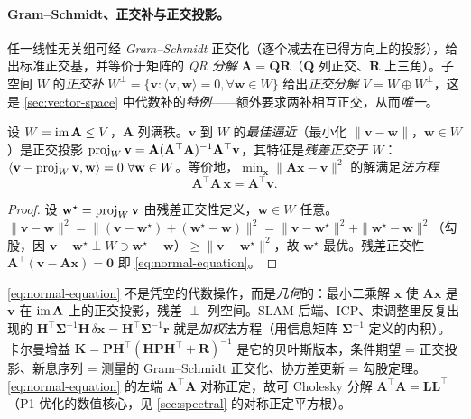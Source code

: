 \paragraph{Gram--Schmidt、正交补与正交投影。}
任一线性无关组可经 \emph{Gram--Schmidt} 正交化（逐个减去在已得方向上的投影），给出标准正交基，并等价于矩阵的 \emph{QR 分解} $\mathbf{A}=\mathbf{Q}\mathbf{R}$（$\mathbf{Q}$ 列正交、$\mathbf{R}$ 上三角）。子空间 $W$ 的\emph{正交补} $W^\perp=\{\mathbf{v}:\langle\mathbf{v},\mathbf{w}\rangle=0,\forall\mathbf{w}\in W\}$ 给出\emph{正交分解} $V=W\oplus W^\perp$，这是 \cref{sec:vector-space} 中代数补的\emph{特例}——额外要求两补相互正交，从而\emph{唯一}。

\begin{theorem}[正交投影与法方程]\label{thm:projection}
设 $W=\operatorname{im}\mathbf{A}\le V$，$\mathbf{A}$ 列满秩。$\mathbf{v}$ 到 $W$ 的\emph{最佳逼近}（最小化 $\|\mathbf{v}-\mathbf{w}\|$，$\mathbf{w}\in W$）是正交投影 $\operatorname{proj}_W\mathbf{v}=\mathbf{A}(\mathbf{A}^\top\mathbf{A})^{-1}\mathbf{A}^\top\mathbf{v}$，其特征是\emph{残差正交于 $W$}：$\langle\mathbf{v}-\proj_W\mathbf{v},\mathbf{w}\rangle=0\ \forall\mathbf{w}\in W$。等价地，$\min_{\mathbf{x}}\|\mathbf{A}\mathbf{x}-\mathbf{v}\|^2$ 的解满足\emph{法方程}
\begin{equation}
  \mathbf{A}^\top\mathbf{A}\,\mathbf{x}=\mathbf{A}^\top\mathbf{v}.
  \label{eq:normal-equation}
\end{equation}
\end{theorem}
\begin{proof}
设 $\mathbf{w}^\star=\operatorname{proj}_W\mathbf{v}$ 由残差正交性定义，$\mathbf{w}\in W$ 任意。$\|\mathbf{v}-\mathbf{w}\|^2=\|(\mathbf{v}-\mathbf{w}^\star)+(\mathbf{w}^\star-\mathbf{w})\|^2=\|\mathbf{v}-\mathbf{w}^\star\|^2+\|\mathbf{w}^\star-\mathbf{w}\|^2$（勾股，因 $\mathbf{v}-\mathbf{w}^\star\perp W\ni\mathbf{w}^\star-\mathbf{w}$）$\ge\|\mathbf{v}-\mathbf{w}^\star\|^2$，故 $\mathbf{w}^\star$ 最优。残差正交性 $\mathbf{A}^\top(\mathbf{v}-\mathbf{A}\mathbf{x})=\mathbf{0}$ 即 \cref{eq:normal-equation}。
\end{proof}

\begin{insight}[法方程 = 把观测正交投影到模型列空间]
\cref{eq:normal-equation} 不是凭空的代数操作，而是\emph{几何}的：最小二乘解 $\mathbf{x}$ 使 $\mathbf{A}\mathbf{x}$ 是 $\mathbf{v}$ 在 $\operatorname{im}\mathbf{A}$ 上的正交投影，残差 $\perp$ 列空间。SLAM 后端、ICP、束调整里反复出现的 $\mathbf{H}^\top\boldsymbol{\Sigma}^{-1}\mathbf{H}\,\delta\mathbf{x}=\mathbf{H}^\top\boldsymbol{\Sigma}^{-1}\mathbf{r}$ 就是\emph{加权}法方程（用信息矩阵 $\boldsymbol{\Sigma}^{-1}$ 定义的内积）。卡尔曼增益 $\mathbf{K}=\mathbf{P}\mathbf{H}^\top(\mathbf{H}\mathbf{P}\mathbf{H}^\top+\mathbf{R})^{-1}$ 是它的贝叶斯版本，条件期望 = 正交投影、新息序列 = 测量的 Gram--Schmidt 正交化、协方差更新 = 勾股定理。\cref{eq:normal-equation} 的左端 $\mathbf{A}^\top\mathbf{A}$ 对称正定，故可 Cholesky 分解 $\mathbf{A}^\top\mathbf{A}=\mathbf{L}\mathbf{L}^\top$（P1 优化的数值核心，见 \cref{sec:spectral} 的对称正定平方根）。
\end{insight}

